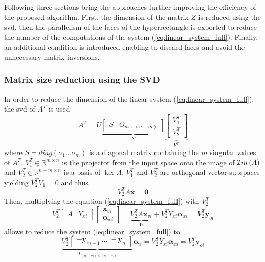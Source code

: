 Following three sections bring the approaches further improving the efficiency of the proposed algorithm. First, the dimension of the matrix $Z$ is reduced using the \gls{svd}, then the parallelism of the faces of the hyperrectangle is exported to reduce the number of the computations of the system (\ref{eq:linear_system_full}). Finally, an additional condition is introduced enabling to discard faces and avoid the unnecessary matrix inversions.


\subsubsection{Matrix size reduction using the SVD}

In order to reduce the dimension of the linear system (\ref{eq:linear_system_full}), the \gls{svd} \cite{klema_singular_1980} of $A^T$ is used
\begin{equation}
     A^T =  U  \underbrace{\begin{bmatrix}S & O_{m\times (n-m)}\end{bmatrix}}_{\Sigma}\underbrace{\begin{bmatrix}V_1^T \\ V_2^T \end{bmatrix}}_{V^T}
\end{equation}
where $S= diag( \sigma_1 \dots \sigma_m)$ is a diagonal matrix containing the $m$ singular values of $A^T$. $V_1^T \in \mathbb{R}^{m \times n}$ is the projector from the input space onto the image of $\mathcal{I}m\left(A\right)$ and $V_2^T \in \mathbb{R}^{n-m \times n}$ is a basis of $\ker{A}$. $V_1^T$ and $V_2^T$ are orthogonal vector subspaces yielding $V_2^T V_1 = 0$ and thus 
\begin{equation}
    V_2^T A\bm{x} = \bm{0}
\end{equation}
Then, multiplying the equation (\ref{eq:linear_system_full}) with $V^T_2$
\begin{equation}
    V_2^T\begin{bmatrix}A &Y_{xi} \end{bmatrix}\begin{bmatrix}\bm{x}_{vi}\\ \bm{\alpha}_{xi} \end{bmatrix}  = \underbrace{V_2^TA\bm{x}_{vi}}_{\bm{0}} + V_2^TY_{xi}\bm{\alpha}_{xi} = V_2^T\bm{y}_{oi} 
\end{equation}
allows to reduce the system (\ref{eq:linear_system_full}) to
\begin{equation}
    \underbrace{V_2^T\begin{bmatrix}-\bm{y}_{m+1} ~\dots~ -\bm{y}_{n} \end{bmatrix}}_{T_{(n-m)\times (n-m)}} \bm{\alpha}_x  = V_2^TY_{xi}\bm{\alpha}_{xi} = V_2^T\bm{y}_{oi}
    \label{eq:linear_system_svd}
\end{equation}

